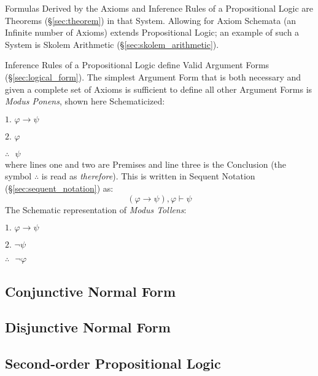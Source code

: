Formulas Derived by the Axioms and Inference Rules of a Propositional
Logic are Theorems (\S\ref{sec:theorem}) in that System. Allowing for
Axiom Schemata (an Infinite number of Axioms) extends Propositional
Logic; an example of such a System is Skolem Arithmetic
(\S\ref{sec:skolem_arithmetic}).

Inference Rules of a Propositional Logic define Valid Argument Forms
(\S\ref{sec:logical_form}). The simplest Argument Form that is both
necessary and given a complete set of Axioms is sufficient to define
all other Argument Forms is \emph{Modus Ponens}, shown here
Schematicized:

$\textrm{1. }\varphi \rightarrow \psi$

$\textrm{2. }\varphi$

$\therefore\textrm{ }\psi$ \\
where lines one and two are Premises and
line three is the Conclusion (the symbol $\therefore$ is read as
\emph{therefore}). This is written in Sequent Notation
(\S\ref{sec:sequent_notation}) as:
\[
  (\varphi \rightarrow \psi), \varphi \vdash \psi
\]
The Schematic representation of \emph{Modus Tollens}:

$\textrm{1. }\varphi \rightarrow \psi$

$\textrm{2. }\neg\psi$

$\therefore\textrm{ }\neg\varphi$\\



\subsection{Conjunctive Normal Form}\label{sec:conjunctive_form}

\subsection{Disjunctive Normal Form}\label{sec:disjunctive_form}

\subsection{Second-order Propositional Logic}
\label{sec:secondorder_propositional_logic}

